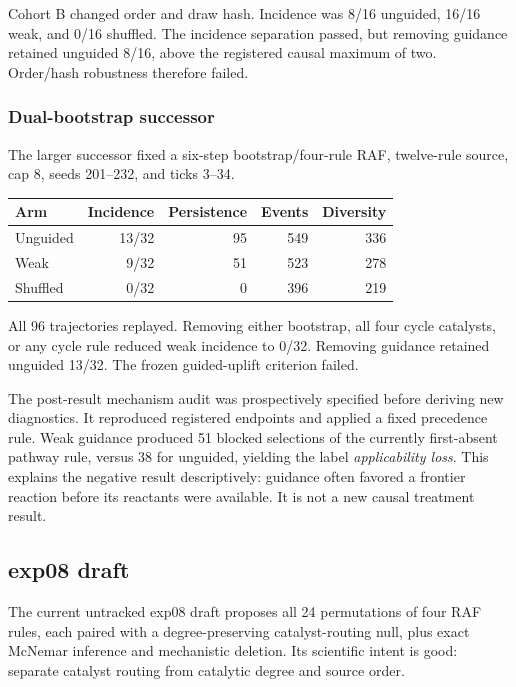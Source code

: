 \documentclass[11pt]{article}
\begin{document}
Cohort B changed order and draw hash.  Incidence was 8/16 unguided, 16/16
weak, and 0/16 shuffled.  The incidence separation passed, but removing
guidance retained unguided 8/16, above the registered causal maximum of two.
Order/hash robustness therefore failed.

\subsubsection{Dual-bootstrap successor}

The larger successor fixed a six-step bootstrap/four-rule RAF, twelve-rule
source, cap 8, seeds 201--232, and ticks 3--34.

\begin{center}
\begin{tabular}{lrrrr}
\toprule
Arm & Incidence & Persistence & Events & Diversity \\
\midrule
Unguided & 13/32 & 95 & 549 & 336 \\
Weak & 9/32 & 51 & 523 & 278 \\
Shuffled & 0/32 & 0 & 396 & 219 \\
\bottomrule
\end{tabular}
\end{center}

All 96 trajectories replayed.  Removing either bootstrap, all four cycle
catalysts, or any cycle rule reduced weak incidence to 0/32.  Removing guidance
retained unguided 13/32.  The frozen guided-uplift criterion failed.

The post-result mechanism audit was prospectively specified before deriving
new diagnostics.  It reproduced registered endpoints and applied a fixed
precedence rule.  Weak guidance produced 51 blocked selections of the currently
first-absent pathway rule, versus 38 for unguided, yielding the label
\emph{applicability loss}.  This explains the negative result descriptively:
guidance often favored a frontier reaction before its reactants were available.
It is not a new causal treatment result.

\subsection{exp08 draft}

The current untracked exp08 draft proposes all 24 permutations of four RAF
rules, each paired with a degree-preserving catalyst-routing null, plus exact
McNemar inference and mechanistic deletion.  Its scientific intent is good:
separate catalyst routing from catalytic degree and source order.
\end{document}
